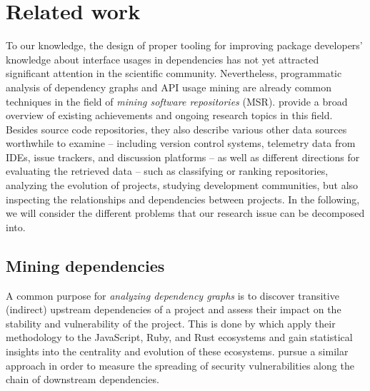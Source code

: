\section{Related work}
\label{sec:related_work}

To our knowledge, the design of proper tooling for improving package developers' knowledge about interface usages in dependencies has not yet attracted significant attention in the scientific community.
Nevertheless, programmatic analysis of dependency graphs and API usage mining are already common techniques in the field of \emph{mining software repositories} (MSR).
\citet{chaturvedi2013tools} provide a broad overview of existing achievements and ongoing research topics in this field.
Besides source code repositories, they also describe various other data sources worthwhile to examine -- including version control systems, telemetry data from IDEs, issue trackers, and discussion platforms -- as well as different directions for evaluating the retrieved data -- such as classifying or ranking repositories, analyzing the evolution of projects, studying development communities, but also inspecting the relationships and dependencies between projects.
In the following, we will consider the different problems that our research issue can be decomposed into.

\subsection{Mining dependencies}

A common purpose for \emph{analyzing dependency graphs} is to discover transitive (indirect) upstream dependencies of a project and assess their impact on the stability and vulnerability of the project.
This is done by \citet{kikas2017structure} which apply their methodology to the JavaScript, Ruby, and Rust ecosystems and gain statistical insights into the centrality and evolution of these ecosystems.
\citet{decan2018impact} pursue a similar approach in order to measure the spreading of security vulnerabilities along the chain of downstream dependencies.

